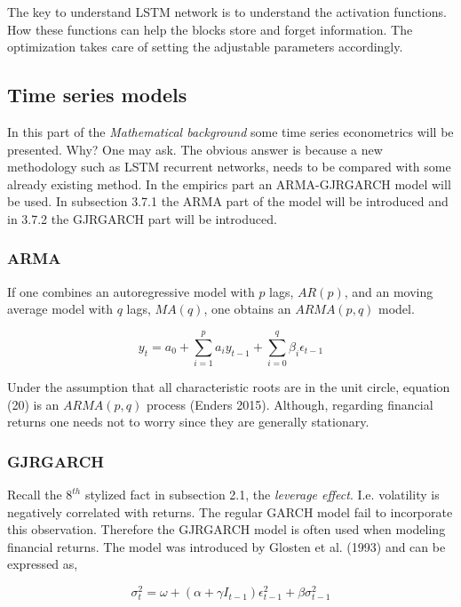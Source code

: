 \documentclass[12pt, letterpaper]{amsart}%
\begin{document}
The key to understand LSTM network is to understand the activation functions. How these functions can help the blocks store and forget information. The optimization takes care of setting the adjustable parameters accordingly.

\subsection{Time series models}
In this part of the \textit{Mathematical background} some time series econometrics will be presented. Why? One may ask. The obvious answer is because a new methodology such as LSTM recurrent networks, needs to be compared with some already existing method. In the empirics part an ARMA-GJRGARCH model will be used. In subsection 3.7.1 the ARMA part of the model will be introduced and in 3.7.2 the GJRGARCH part will be introduced.

\subsubsection{ARMA}
If one combines an autoregressive model with $p$ lags, $AR(p)$, and an moving average model with $q$ lags, $MA(q)$, one obtains an $ARMA(p,q)$ model.

\begin{equation}
y_t = a_0 + \sum_{i=1}^p a_i y_{t-1} + \sum_{i=0}^q \beta_i \epsilon_{t-1} 
\end{equation}

Under the assumption that all characteristic roots are in the unit circle, equation (20) is an $ARMA(p,q)$ process (Enders 2015). Although, regarding financial returns one needs not to worry since they are generally stationary.

\subsubsection{GJRGARCH}
Recall the $8^{th}$ stylized fact in subsection 2.1, the \textit{leverage effect}. I.e. volatility is negatively correlated with returns. The regular GARCH model fail to incorporate this observation. Therefore the GJRGARCH model is often used when modeling financial returns. The model was introduced by Glosten et al. (1993) and can be expressed as,

\begin{equation}
\sigma_t^2 = \omega + (\alpha + \gamma I_{t-1}) \epsilon_{t-1}^2 + \beta \sigma^2_{t-1}
\end{equation}
\end{document}
